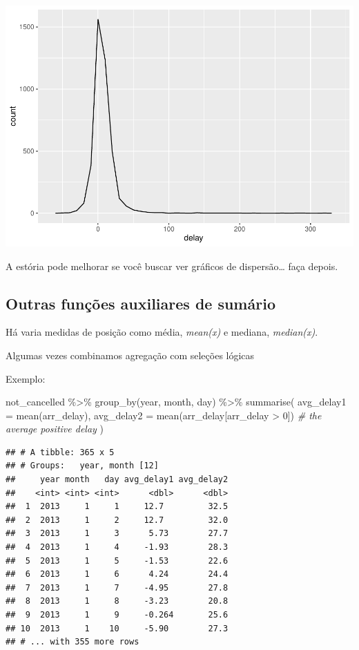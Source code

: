 \documentclass[
]{article}
\newenvironment{Shaded}{\begin{snugshade}}{\end{snugshade}}
\newcommand{\AttributeTok}[1]{\textcolor[rgb]{0.77,0.63,0.00}{#1}}
\newcommand{\CommentTok}[1]{\textcolor[rgb]{0.56,0.35,0.01}{\textit{#1}}}
\newcommand{\DecValTok}[1]{\textcolor[rgb]{0.00,0.00,0.81}{#1}}
\newcommand{\FunctionTok}[1]{\textcolor[rgb]{0.00,0.00,0.00}{#1}}
\newcommand{\NormalTok}[1]{#1}
\newcommand{\SpecialCharTok}[1]{\textcolor[rgb]{0.00,0.00,0.00}{#1}}
\begin{document}
\includegraphics{mind2_files/figure-latex/unnamed-chunk-38-1.pdf}

A estória pode melhorar se você buscar ver gráficos de dispersão\ldots{}
faça depois.

\hypertarget{outras-funuxe7uxf5es-auxiliares-de-sumuxe1rio}{%
\subsection{Outras funções auxiliares de
sumário}\label{outras-funuxe7uxf5es-auxiliares-de-sumuxe1rio}}

Há varia medidas de posição como média, \emph{mean(x)} e mediana,
\emph{median(x)}.

Algumas vezes combinamos agregação com seleções lógicas

Exemplo:

\begin{Shaded}
\begin{Highlighting}[]
\NormalTok{not\_cancelled }\SpecialCharTok{\%\textgreater{}\%} 
  \FunctionTok{group\_by}\NormalTok{(year, month, day) }\SpecialCharTok{\%\textgreater{}\%} 
  \FunctionTok{summarise}\NormalTok{(}
    \AttributeTok{avg\_delay1 =} \FunctionTok{mean}\NormalTok{(arr\_delay),}
    \AttributeTok{avg\_delay2 =} \FunctionTok{mean}\NormalTok{(arr\_delay[arr\_delay }\SpecialCharTok{\textgreater{}} \DecValTok{0}\NormalTok{]) }\CommentTok{\# the average positive delay}
\NormalTok{  )}
\end{Highlighting}
\end{Shaded}

\begin{verbatim}
## # A tibble: 365 x 5
## # Groups:   year, month [12]
##     year month   day avg_delay1 avg_delay2
##    <int> <int> <int>      <dbl>      <dbl>
##  1  2013     1     1     12.7         32.5
##  2  2013     1     2     12.7         32.0
##  3  2013     1     3      5.73        27.7
##  4  2013     1     4     -1.93        28.3
##  5  2013     1     5     -1.53        22.6
##  6  2013     1     6      4.24        24.4
##  7  2013     1     7     -4.95        27.8
##  8  2013     1     8     -3.23        20.8
##  9  2013     1     9     -0.264       25.6
## 10  2013     1    10     -5.90        27.3
## # ... with 355 more rows
\end{verbatim}
\end{document}
